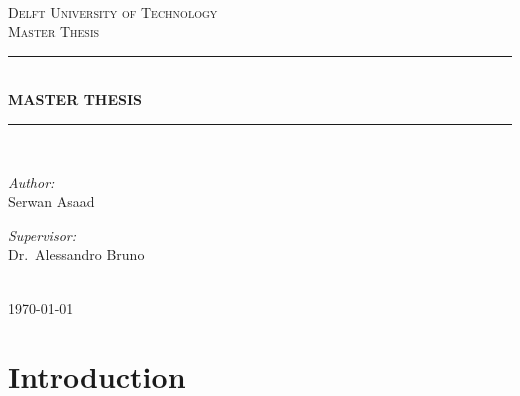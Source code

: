 \documentclass[12pt]{report}
\newcommand{\HRule}[1]{\rule{\linewidth}{#1}}
\begin{document}
\begin{titlepage}
\begin{center}
~\\ [4.0 cm]
\textsc{\LARGE Delft University of Technology}
\\ [3.0 cm]
\textsc{\Large Master Thesis}
\HRule{0.5 pt} \\
\LARGE \textbf{\uppercase{Master thesis}}
\HRule{2 pt} \\ [0.5 cm]

\noindent
\begin{minipage}{0.4\textwidth}
\begin{flushleft} \large
\emph{Author:}\\
Serwan Asaad
\end{flushleft}
\end{minipage}%
\begin{minipage}{0.4\textwidth}
\begin{flushright} \large
\emph{Supervisor:} \\
Dr.~Alessandro Bruno
\end{flushright}
\end{minipage}
\\ [3.0 cm]
{\large \today}
\end{center}

\end{titlepage}


\author{
    Serwan Asaad
    Student ID: 4323475 \\
    Delft University of Technology \\
    Kavli Institute of Nanoscience\\
    Quantum Nanoscience Department\\
    Quantum Transport Group\\
    DiCarlo Lab}

\tableofcontents
\newpage

\sectionfont{\scshape}


\section*{Introduction}
\end{document}
